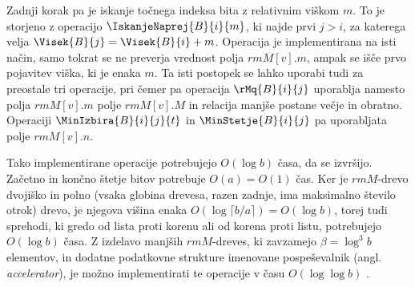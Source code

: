 Zadnji korak pa je iskanje točnega indeksa bita z relativnim viškom $m$. To je storjeno z operacijo $\IskanjeNaprej{B}{i}{m}$, ki najde prvi $j> i$, za katerega velja $\Visek{B}{j}=\Visek{B}{i}+m$. Operacija je implementirana na isti način, samo tokrat se ne preverja vrednost polja $rmM[v].m$, ampak se išče prvo pojavitev viška, ki je enaka $m$. Ta isti postopek se lahko uporabi tudi za preostale tri operacije, pri čemer pa operacija $\rMq{B}{i}{j}$ uporablja namesto polja $rmM[v].m$ polje $rmM[v].M$ in relacija manjše postane večje in obratno. Operaciji $\MinIzbira{B}{i}{j}{t}$ in $\MinStetje{B}{i}{j}$ pa uporabljata polje $rmM[v].n$\cite{Navarro2016}.

Tako implementirane operacije potrebujejo $O(\log{b})$ časa, da se izvršijo. Začetno in končno štetje bitov potrebuje $O(a)=O(1)$ čas. Ker je $rmM$-drevo dvojiško in polno (vsaka globina drevesa, razen zadnje, ima maksimalno število otrok) drevo, je njegova višina enaka $O(\log{\lceil b/a\rceil})=O(\log{b})$, torej tudi sprehodi, ki gredo od lista proti korenu ali od korena proti listu, potrebujejo $O(\log{b})$ časa. Z izdelavo manjših $rmM$-dreves, ki zavzamejo $\beta=\log^3{b}$ elementov, in dodatne podatkovne strukture imenovane pospeševalnik (angl. \textit{accelerator}), je možno implementirati te operacije v času $O(\log\log{b})$ \cite{Navarro2016}.